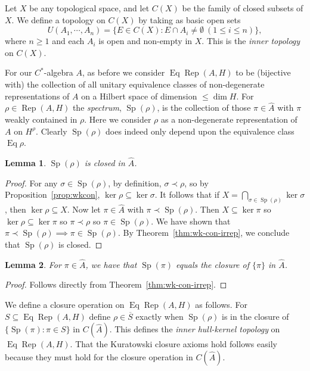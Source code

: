 \documentclass[a4paper,11pt]{article}
\newcommand{\Rep}{\operatorname{Rep}}
\newcommand{\Eq}{\operatorname{Eq}}
\newcommand{\Sp}{\operatorname{Sp}}
\newtheorem{lemma}{Lemma}[section]
\begin{document}
Let $X$ be any topological space, and let $C(X)$ be the family of closed subsets
of $X$.  We define a topology on $C(X)$ by taking as basic open sets
\[ U(A_1,\cdots,A_n) = \{ E\in C(X) : E \cap A_i\not=\emptyset \ (1 \leq i
\leq n) \}, \]
where $n\geq 1$ and each $A_i$ is open and non-empty in $X$.  This is the
\emph{inner topology} on $C(X)$.

For our $C^*$-algebra $A$, as before we consider $\Eq\Rep(A,H)$ to be (bijective
with) the collection of all unitary equivalence classes of non-degenerate
representations of $A$ on a Hilbert space of dimension $\leq\dim H$.  For
$\rho\in\Rep(A,H)$ the \emph{spectrum}, $\Sp(\rho)$, is the collection of those
$\pi\in\hat A$ with $\pi$ weakly contained in $\rho$.  Here we consider $\rho$
as a non-degenerate representation of $A$ on $H^\rho$.  Clearly $\Sp(\rho)$ does 
indeed only depend upon the equivalence class $\Eq\rho$.

\begin{lemma}
$\Sp(\rho)$ is closed in $\hat A$.
\end{lemma}
\begin{proof}
For any $\sigma\in\Sp(\rho)$, by definition, $\sigma\prec\rho$, so by
Proposition~\ref{prop:wkcon}, $\ker\rho \subseteq\ker\sigma$.  It follows
that if $X = \bigcap_{\sigma\in\Sp(\rho)} \ker \sigma$, then $\ker\rho \subseteq
X$.  Now let $\pi\in\hat A$ with $\pi\prec\Sp(\rho)$.  Then $X\subseteq\ker\pi$
so $\ker\rho \subseteq\ker\pi$ so $\pi\prec\rho$ so $\pi\in\Sp(\rho)$.  We have
shown that $\pi\prec\Sp(\rho) \implies \pi\in\Sp(\rho)$.  By 
Theorem~\ref{thm:wk-con-irrep}, we conclude that $\Sp(\rho)$ is closed.
\end{proof}

\begin{lemma}\label{lem:supp_in_dual_A}
For $\pi\in\hat A$, we have that $\Sp(\pi)$ equals the closure of $\{\pi\}$
in $\hat A$.
\end{lemma}
\begin{proof}
Follows directly from Theorem~\ref{thm:wk-con-irrep}.
\end{proof}

We define a closure operation on $\Eq\Rep(A,H)$ as follows.  For $S\subseteq
\Eq\Rep(A,H)$ define $\rho\in\overline{S}$ exactly when $\Sp(\rho)$ is in the
closure of $\{\Sp(\pi) : \pi\in S\}$ in $C(\hat A)$.  This defines the
\emph{inner hull-kernel topology} on $\Eq\Rep(A,H)$.  That the Kuratowski
closure axioms hold follows easily because they must hold for the closure
operation in $C(\hat A)$.
\end{document}
